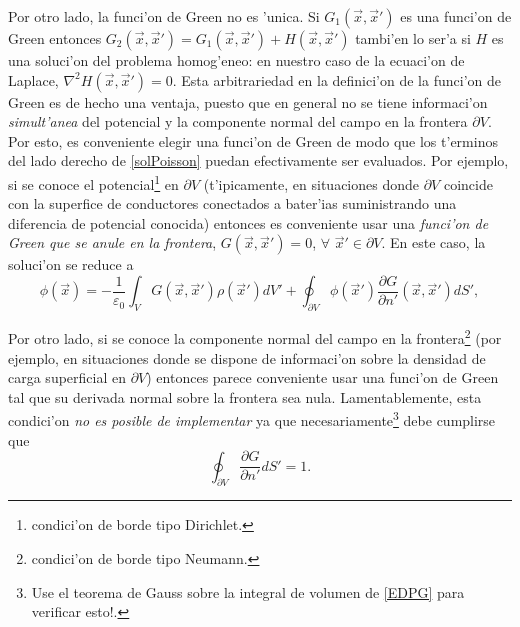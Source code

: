 Por otro lado, la funci'on de Green no es 'unica. Si $G_1(\vec{x},\vec{x}')$ es una funci'on de Green entonces $G_2(\vec{x},\vec{x}')=G_1(\vec{x},\vec{x}')+H(\vec{x},\vec{x}')$ tambi'en lo ser'a si $H$ es una soluci'on del problema homog'eneo: en nuestro caso de la ecuaci'on de Laplace, $\nabla^2H(\vec{x},\vec{x}')=0$. Esta arbitrariedad en la definici'on de la funci'on de Green es de hecho una ventaja, puesto que en general no se tiene informaci'on \textit{simult'anea} del potencial y la componente normal del campo en la frontera $\partial V$. Por esto, es conveniente elegir una funci'on de Green de modo que los t'erminos del lado derecho de \eqref{solPoisson} puedan efectivamente ser evaluados. Por ejemplo, si se conoce el potencial\footnote{condici'on de borde tipo Dirichlet.} en $\partial V$ (t'ipicamente, en situaciones donde $\partial V$ coincide con la superfice de conductores conectados a bater'ias suministrando una diferencia de potencial conocida) entonces es conveniente usar una \textit{funci'on de Green que se anule en la frontera}, $G(\vec{x},\vec{x}')=0$, $\forall$ $\vec{x}'\in\partial V$. En este caso, la soluci'on se reduce a
\begin{equation}\label{solPoissonDirichlet}
\phi(\vec{x})= -\frac{1}{\varepsilon_0}\int_VG(\vec{x},\vec{x}') \rho(\vec{x}')dV'+\oint_{\partial V}\phi(\vec{x}')\frac{\partial G}{\partial n'}(\vec{x},\vec{x}')dS',
\end{equation}

 Por otro lado, si se conoce la componente normal del campo en la frontera\footnote{condici'on de borde tipo Neumann.} (por ejemplo, en situaciones donde se dispone de informaci'on sobre la densidad de carga superficial en $\partial V$) entonces parece conveniente usar una funci'on de Green tal que su derivada normal sobre la frontera sea nula. Lamentablemente, esta condici'on \textit{no es posible de implementar} ya que necesariamente\footnote{Use el teorema de Gauss sobre la integral de volumen de \eqref{EDPG} para verificar esto!.} debe cumplirse que
\begin{equation}\label{intGn}
\oint_{\partial V}\frac{\partial G}{\partial n'}dS'=1.
\end{equation}


